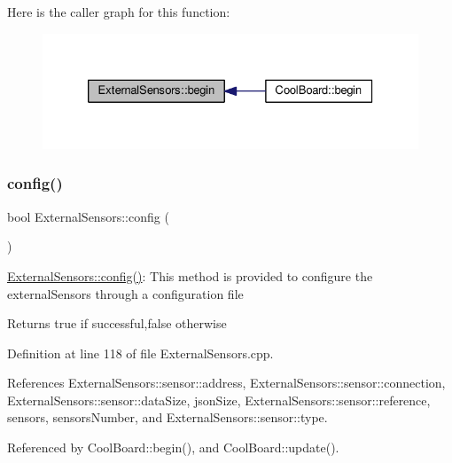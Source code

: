 Here is the caller graph for this function\+:\nopagebreak
\begin{figure}[H]
\begin{center}
\leavevmode
\includegraphics[width=326pt]{classExternalSensors_a58ede0d786a86417254708870f04a21e_icgraph}
\end{center}
\end{figure}
\mbox{\label{classExternalSensors_a862a4bd11346b37270d0244c2adabe5a}} 
\subsubsection{\texorpdfstring{config()}{config()}}
{\footnotesize\ttfamily bool External\+Sensors\+::config (\begin{DoxyParamCaption}{ }\end{DoxyParamCaption})}

\hyperlink{classExternalSensors_a862a4bd11346b37270d0244c2adabe5a}{External\+Sensors\+::config()}\+: This method is provided to configure the external\+Sensors through a configuration file

\begin{DoxyReturn}{Returns}
true if successful,false otherwise 
\end{DoxyReturn}


Definition at line 118 of file External\+Sensors.\+cpp.



References External\+Sensors\+::sensor\+::address, External\+Sensors\+::sensor\+::connection, External\+Sensors\+::sensor\+::data\+Size, json\+Size, External\+Sensors\+::sensor\+::reference, sensors, sensors\+Number, and External\+Sensors\+::sensor\+::type.



Referenced by Cool\+Board\+::begin(), and Cool\+Board\+::update().


